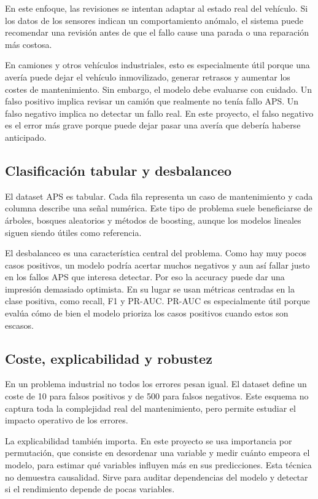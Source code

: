 \documentclass[11pt,a4paper]{article}
\begin{document}
En este enfoque, las revisiones se intentan adaptar al estado real del vehículo. Si los datos de los sensores indican un comportamiento anómalo, el sistema puede recomendar una revisión antes de que el fallo cause una parada o una reparación más costosa.

En camiones y otros vehículos industriales, esto es especialmente útil porque una avería puede dejar el vehículo inmovilizado, generar retrasos y aumentar los costes de mantenimiento. Sin embargo, el modelo debe evaluarse con cuidado. Un falso positivo implica revisar un camión que realmente no tenía fallo APS. Un falso negativo implica no detectar un fallo real. En este proyecto, el falso negativo es el error más grave porque puede dejar pasar una avería que debería haberse anticipado.

\subsection{Clasificación tabular y desbalanceo}

El dataset APS es tabular. Cada fila representa un caso de mantenimiento y cada columna describe una señal numérica. Este tipo de problema suele beneficiarse de árboles, bosques aleatorios y métodos de boosting, aunque los modelos lineales siguen siendo útiles como referencia.

El desbalanceo es una característica central del problema. Como hay muy pocos casos positivos, un modelo podría acertar muchos negativos y aun así fallar justo en los fallos APS que interesa detectar. Por eso la accuracy puede dar una impresión demasiado optimista. En su lugar se usan métricas centradas en la clase positiva, como recall, F1 y PR-AUC. PR-AUC es especialmente útil porque evalúa cómo de bien el modelo prioriza los casos positivos cuando estos son escasos.

\subsection{Coste, explicabilidad y robustez}

En un problema industrial no todos los errores pesan igual. El dataset define un coste de 10 para falsos positivos y de 500 para falsos negativos. Este esquema no captura toda la complejidad real del mantenimiento, pero permite estudiar el impacto operativo de los errores.


La explicabilidad también importa. En este proyecto se usa importancia por permutación, que consiste en desordenar una variable y medir cuánto empeora el modelo, para estimar qué variables influyen más en sus predicciones. Esta técnica no demuestra causalidad. Sirve para auditar dependencias del modelo y detectar si el rendimiento depende de pocas variables.
\end{document}
